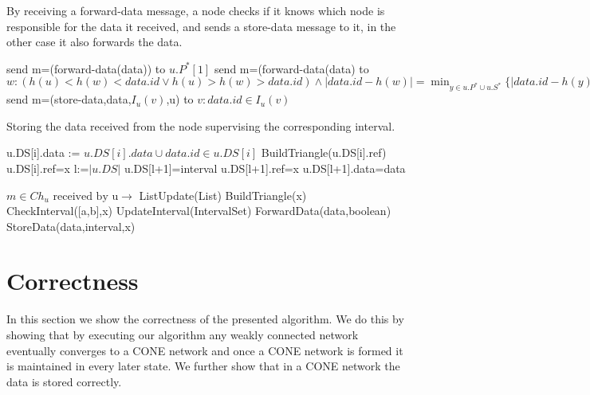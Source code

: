 \documentclass[11pt]{article}
\begin{document}
\begin{algorithm}
By receiving a forward-data message, a node checks if it knows which node is responsible for the data it received, and sends a store-data message to it, in the other case it also forwards the data.

\begin{algorithmic}
\If {$data.id \in [u.P^*[1]],u]$}
\State send m=(forward-data(data)) to $u.P^*[1]$
\Else
\State send m=(forward-data(data) to
\State $w: (h(u)<h(w)<data.id \vee h(u)>h(w)>data.id)\wedge  |data.id-h(w)| = \min_{y \in u.P^*\cup u.S^*}\{|data.id-h(y)| \},  $
\EndIf
\Else
\State send m=(store-data,data,$I_u(v)$,u) to $v: data.id\in I_u(v)$
\EndIf
\EndFunction
\end{algorithmic}
\end{algorithm}
\begin{algorithm}
Storing the data received from the node supervising the corresponding interval.

\begin{algorithmic}
\State u.DS[i].data := $u.DS[i].data \cup data.id \in u.DS[i]$
\State BuildTriangle(u.DS[i].ref)
\State u.DS[i].ref=x
\Else
\State l:=$|u.DS|$
\State u.DS[l+1]=interval
\State u.DS[l+1].ref=x
\State u.DS[l+1].data=data
\EndIf
\EndFunction
\end{algorithmic}
\end{algorithm}


\begin{algorithm}
\begin{algorithmic}
\State $m \in Ch_u \text{ received by u} \rightarrow$ 
\State ListUpdate(List)
\State BuildTriangle(x)
\State CheckInterval([a,b],x)
\State UpdateInterval(IntervalSet)
\State ForwardData(data,boolean)
\State StoreData(data,interval,x)
\EndIf

\end{algorithmic}
\end{algorithm}
\section{Correctness}
In this section we show the correctness of the presented algorithm. We do this by showing that by executing our algorithm any weakly connected network eventually converges to a CONE network and once a CONE network is formed it is maintained in every later state. We further show that in a CONE network the data is stored correctly.
\end{document}
